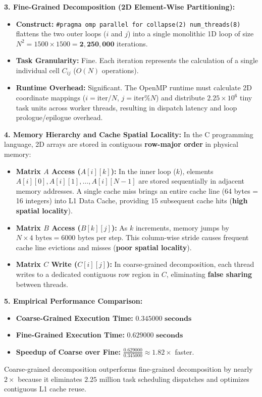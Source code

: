 \documentclass[12pt]{article}
\begin{document}
\textbf{3. Fine-Grained Decomposition (2D Element-Wise Partitioning):}
\begin{itemize}
    \item \textbf{Construct:} \texttt{\#pragma omp parallel for collapse(2) num\_threads(8)} flattens the two outer loops ($i$ and $j$) into a single monolithic 1D loop of size $N^2 = 1500 \times 1500 = \mathbf{2,250,000}$ iterations.
    \item \textbf{Task Granularity:} Fine. Each iteration represents the calculation of a single individual cell $C_{ij}$ ($O(N)$ operations).
    \item \textbf{Runtime Overhead:} Significant. The OpenMP runtime must calculate 2D coordinate mappings ($i = \text{iter} / N$, $j = \text{iter} \% N$) and distribute $2.25 \times 10^6$ tiny task units across worker threads, resulting in dispatch latency and loop prologue/epilogue overhead.
\end{itemize}

\textbf{4. Memory Hierarchy and Cache Spatial Locality:}
In the C programming language, 2D arrays are stored in contiguous \textbf{row-major order} in physical memory:
\begin{itemize}
    \item \textbf{Matrix $A$ Access ($A[i][k]$):} In the inner loop ($k$), elements $A[i][0], A[i][1], \dots, A[i][N-1]$ are stored sequentially in adjacent memory addresses. A single cache miss brings an entire cache line (64 bytes = 16 integers) into L1 Data Cache, providing $15$ subsequent cache hits (\textbf{high spatial locality}).
    \item \textbf{Matrix $B$ Access ($B[k][j]$):} As $k$ increments, memory jumps by $N \times 4\text{ bytes} = 6000\text{ bytes}$ per step. This column-wise stride causes frequent cache line evictions and misses (\textbf{poor spatial locality}).
    \item \textbf{Matrix $C$ Write ($C[i][j]$):} In coarse-grained decomposition, each thread writes to a dedicated contiguous row region in $C$, eliminating \textbf{false sharing} between threads.
\end{itemize}

\textbf{5. Empirical Performance Comparison:}
\begin{itemize}
    \item \textbf{Coarse-Grained Execution Time:} $\mathbf{0.345000\text{ seconds}}$
    \item \textbf{Fine-Grained Execution Time:} $\mathbf{0.629000\text{ seconds}}$
    \item \textbf{Speedup of Coarse over Fine:} $\frac{0.629000}{0.345000} \approx \mathbf{1.82\times}$ faster.
\end{itemize}
Coarse-grained decomposition outperforms fine-grained decomposition by nearly $2\times$ because it eliminates $2.25$ million task scheduling dispatches and optimizes contiguous L1 cache reuse.
\end{document}
